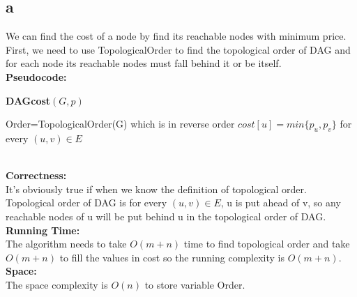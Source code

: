 \documentclass[twoside]{homework}
\begin{document}
\subsection*{a}
We can find the cost of a node by find its reachable nodes with minimum price. First, we need to use TopologicalOrder to find the topological order of DAG and for each node its reachable nodes must fall behind it or be itself.
\\\textbf{Pseudocode:} \quad
\begin{algorithm}
	\caption*{\textbf{DAGcost$(G,p)$}}
	\begin{algorithmic}
		\STATE Order=TopologicalOrder(G)
		\STATE which is in reverse order
		\STATE $cost[u]=min\{p_u,p_v\}$ for every $(u,v)\in E$
		\ENDFOR
	\end{algorithmic}		
\end{algorithm}
\\\textbf{Correctness:} 
\\It's obviously true if when we know the definition of topological order. Topological order of DAG is for every $(u,v)\in E$, u is put ahead of v, so any reachable nodes of u will be put behind u in the topological order of DAG.
\\\textbf{Running Time:} \quad
\\The algorithm needs to take $O(m+n)$ time to find topological order and take $O(m+n)$ to fill the values in cost so the running complexity is $O(m+n)$.
\\\textbf{Space:} \quad
\\The space complexity is $O(n)$ to store variable Order.
\end{document}
